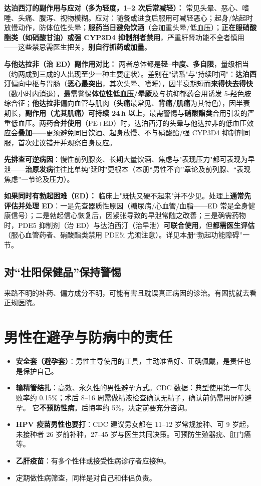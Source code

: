 \documentclass[12pt,UTF8,openany]{ctexbook}
\begin{document}
\textbf{达泊西汀的副作用与应对（多为轻度，1--2 次后常减轻）：} 常见头晕、恶心、嗜睡、头痛、腹泻、视物模糊。应对：随餐或进食后服用可减轻恶心；起身/站起时放慢动作，防体位性头晕；\textbf{服药当日避免饮酒}（会加重头晕/低血压）；\textbf{正在服硝酸酯类（如硝酸甘油）或强 CYP3D4 抑制剂者禁用}，严重肝肾功能不全者慎用——这些禁忌需医生把关，\textbf{别自行抓药或加量}。

\textbf{与他达拉非（治 ED）副作用对比：} 两者总体都是\textbf{轻--中度、多自限}，量级相当（约两成到三成的人出现至少一种主要症状）。差别在"谱系"与"持续时间"：\textbf{达泊西汀}偏向中枢与胃肠（\textbf{恶心最突出}，其次头晕、嗜睡），因半衰期短而\textbf{来得快去得快}（数小时内消退），最需警惕\textbf{体位性低血压/晕厥}及与抗抑郁药合用诱发 5-羟色胺综合征；\textbf{他达拉非}偏向血管与肌肉（\textbf{头痛}最常见、\textbf{背痛/肌痛}为其特色），因半衰期长，\textbf{副作用（尤其肌痛）可持续 24\,h 以上}，最需警惕与\textbf{硝酸酯类}合用引发的严重低血压。两药\textbf{合并使用}（PE+ED）时，达泊西汀的头晕与他达拉非的低血压效应会\textbf{叠加}——更须避免同日饮酒、起身放慢、不与硝酸酯/强 CYP3D4 抑制剂同服，首次建议错开并观察自身反应。

\textbf{先排查可逆病因}：慢性前列腺炎、长期大量饮酒、焦虑与"表现压力"都可表现为早泄——\textbf{治原发病}往往比单纯"延时"更根本（本册“男性不育”章论及前列腺、“表现焦虑”一节论及压力）。

\textbf{如果同时有勃起困难（ED）：} 临床上"既快又硬不起来"并不少见。处理上\textbf{通常先评估并处理 ED}：一是先查器质性原因（糖尿病/心血管/血脂——ED 常是全身健康信号）；二是勃起信心恢复后，因紧张导致的早泄常随之改善；三是确需药物时，PDE5 抑制剂（治 ED）与达泊西汀（治早泄）\textbf{可联合使用}，但\textbf{都需医生评估}（服心血管药者、硝酸酯类禁用 PDE5i 尤须注意）。详见本册“勃起功能障碍”一节。

\subsection*{对“壮阳保健品”保持警惕}

来路不明的补药、偏方成分不明，可能有害且耽误真正病因的诊治。有困扰就去看正规医院。

\section{男性在避孕与防病中的责任}

\begin{itemize}[leftmargin=2em]
  \item \textbf{安全套（避孕套）}：男性主导使用的工具，主动准备好、正确佩戴，是责任也是保护自己。
  \item \textbf{输精管结扎}：高效、永久性的男性避孕方式。CDC 数据：典型使用第一年失败率约
        0.15\%；术后 8--16 周需做精液检查确认无精子，确认前仍需用屏障避孕。
        它\textbf{不预防性病}。后悔率约 5\%，决定前要充分咨询。
  \item \textbf{HPV 疫苗男性也要打}：CDC 建议男女都在 11--12 岁常规接种、可 9 岁起，
        未接种者 26 岁前补种，27--45 岁与医生共同决策。可预防生殖器疣、肛门癌等。
  \item \textbf{乙肝疫苗}：有多个性伴或接受性病诊疗者应接种。
  \item 定期做性病筛查，同样是对自己和伴侣负责。
\end{itemize}
\end{document}
